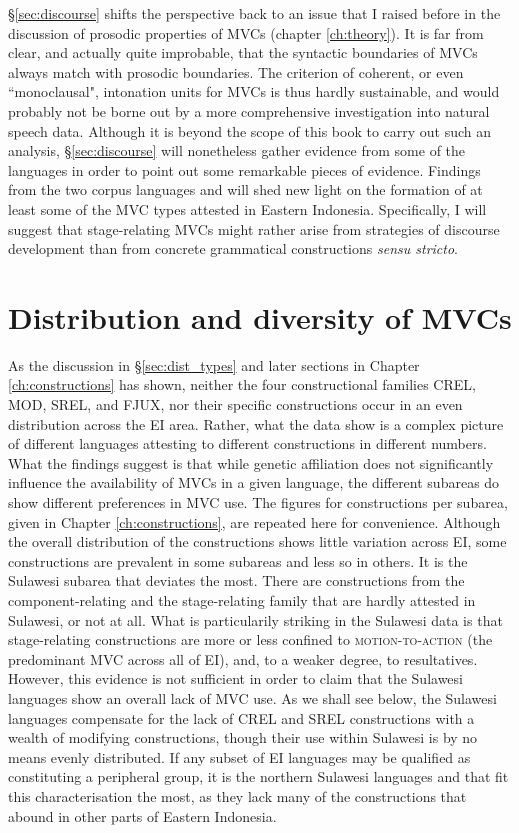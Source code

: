 §\ref{sec:discourse} shifts the perspective back to an issue that I raised before in the discussion of prosodic properties of MVCs (chapter \ref{ch:theory}). It is far from clear, and actually quite improbable, that the syntactic boundaries of MVCs always match with prosodic boundaries. The criterion of coherent, or even ``monoclausal", intonation units for MVCs is thus hardly sustainable, and would probably not be borne out by a more comprehensive investigation into natural speech data. Although it is beyond the scope of this book to carry out such an analysis, §\ref{sec:discourse} will nonetheless gather evidence from some of the languages in order to point out some remarkable pieces of evidence. Findings from the two corpus languages  and  will shed new light on the formation of at least some of the MVC types attested in Eastern Indonesia. Specifically, I will suggest that stage-relating MVCs might rather arise from strategies of discourse development than from concrete grammatical constructions \textit{sensu stricto}.

\section{Distribution and diversity of MVCs} \label{sec:distribution}

As the discussion in §\ref{sec:dist_types} and later sections in Chapter \ref{ch:constructions} has shown, neither the four constructional families CREL, MOD, SREL, and FJUX, nor their specific constructions occur in an even distribution across the EI area. Rather, what the data show is a complex picture of different languages attesting to different constructions in different numbers. What the findings suggest is that while genetic affiliation does not significantly influence the availability of MVCs in a given language, the different subareas do show different preferences in MVC use. The figures for constructions per subarea, given in Chapter \ref{ch:constructions}, are repeated here for convenience. Although the overall distribution of the constructions shows little variation across EI, some constructions are prevalent in some subareas and less so in others. It is the Sulawesi subarea that deviates the most. There are constructions from the component-relating and the stage-relating family that are hardly attested in Sulawesi, or not at all. What is particularily striking in the Sulawesi data is that stage-relating constructions are more or less confined to \textsc{motion-to-action} (the predominant MVC across all of EI), and, to a weaker degree, to resultatives. However, this evidence is not sufficient in order to claim that the Sulawesi languages show an overall lack of MVC use. As we shall see below, the Sulawesi languages compensate for the lack of CREL and SREL constructions with a wealth of modifying constructions, though their use within Sulawesi is by no means evenly distributed. If any subset of EI languages may be qualified as constituting a peripheral group, it is the northern Sulawesi languages  and  that fit this characterisation the most, as they lack many of the constructions that abound in other parts of Eastern Indonesia.

